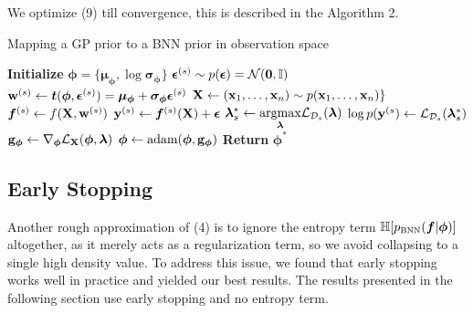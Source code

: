 \documentclass{article}
\begin{document}
We optimize (9) till convergence, this is described in the Algorithm 2. 

\begin{algorithm}
\caption{Mapping a GP prior to a BNN prior in observation space}
\begin{algorithmic}[1]
\State \textbf{Initialize} $\bm \phi =\{ \bm \mu _{\bm \phi} , \log \bm \sigma _{\bm \phi}  \}$
    \State $ \bm \epsilon ^{(s)} \sim p(\bm \epsilon) = \mathcal{N} ( \mathbf{0} , \mathbb{I}) $
    \State $ \mathbf{w}  ^{(s)} \gets \bm t( \bm \phi, \bm \epsilon^{(s)}) = \bm \mu _{\bm \phi} + \bm \sigma _{\bm \phi}\bm \epsilon ^{(s)}$
    \State $ \mathbf{X}  \gets ( \mathbf{x} _1, \dots ,  \mathbf{x} _n) \sim p( \mathbf{x} _1, \dots ,  \mathbf{x} _n) \}$ 
    \State $\bm f ^{(s)} \gets   f( \mathbf{X}  ,  \mathbf{w} ^{(s)} )$ 
    \State $  \mathbf{y}  ^{(s)} \gets \bm f ^ {(s)}( \mathbf{X} ) +\bm \epsilon $ 
         \State $\bm \lambda ^*_s \gets \underset{\bm \lambda}{\text{argmax}} \mathcal{L} _{\mathcal{D} _s } (\bm \lambda)  $
         \State $\log p( \mathbf{y} ^{(s}) \gets  \mathcal{L} _{\mathcal{D} _s } (\bm \lambda ^*_s)  $
    \EndFor
    \State  
    $\B g _{\bm \phi} \gets \nabla _{\bm \phi} \elbo _{\tiny \X} (\bm \phi, \bm \lambda )$
    \State $\bm \phi \gets \text{adam}(\bm\phi , \mathbf{g}  _{\bm \phi} )$
\EndWhile
\State \textbf{Return} $\bm \phi^*$
\end{algorithmic}
\end{algorithm}
\subsection{Early Stopping}

Another rough approximation of (4) is to ignore the entropy term 
$\entropy [\pbnn (\bm f |  \bm \phi ) ]$ 
altogether, as it merely acts as a regularization term, so we avoid collapsing to a single high density value.
To address this issue, we found that early stopping works well in practice and yielded our best results. The results presented in the following section use early stopping and no entropy term. 

\newpage 
\end{document}
